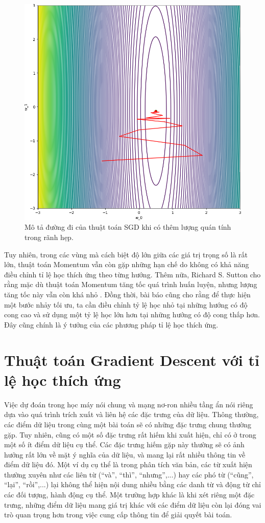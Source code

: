 \begin{figure}[htp]
	\centering
	\includegraphics[width=85 mm]{images/sgdm.png}
	\caption{Mô tả đường đi của thuật toán SGD khi có thêm lượng quán tính trong rãnh hẹp.}
	\label{fig:sgd-m}
\end{figure}

Tuy nhiên, trong các vùng mà cách biệt độ lớn giữa các giá trị trọng số là rất lớn, thuật toán Momentum vẫn còn gặp những hạn chế do không có khả năng điều chỉnh tỉ lệ học thích ứng theo từng hướng. Thêm nữa, Richard S. Sutton cho rằng mặc dù thuật toán Momentum tăng tốc quá trình huấn luyện, nhưng lượng tăng tốc này vẫn còn khá nhỏ \cite{sutton1986two}. Đồng thời, bài báo cũng cho rằng để thực hiện một bước nhảy tối ưu, ta cần điều chỉnh tỷ lệ học nhỏ tại những hướng có độ cong cao và sử dụng một tỷ lệ học lớn hơn tại những hướng có độ cong thấp hơn. Đây cũng chính là ý tưởng của các phương pháp tỉ lệ học thích ứng.

\section{Thuật toán Gradient Descent với tỉ lệ học thích ứng}

Việc dự đoán trong học máy nói chung và mạng nơ-ron nhiều tầng ẩn nói riêng dựa vào quá trình trích xuất và liên hệ các đặc trưng của dữ liệu. Thông thường, các điểm dữ liệu trong cùng một bài toán sẽ có những đặc trưng chung thường gặp. Tuy nhiên, cũng có một số đặc trưng rất hiếm khi xuất hiện, chỉ có ở trong một số ít điểm dữ liệu cụ thể. Các đặc trưng hiếm gặp này thường sẽ có ảnh hưởng rất lớn về mặt ý nghĩa của dữ liệu, và mang lại rất nhiều thông tin về điểm dữ liệu đó\cite{salton1988term}. Một ví dụ cụ thể là trong phân tích văn bản, các từ xuất hiện thường xuyên như các liên từ (``và'', ``thì'', ``nhưng'',...) hay các phó từ (``cũng'', ``lại'', ``rồi'',...) lại không thể hiện nội dung nhiều bằng các danh từ và động từ chỉ các đối tượng, hành động cụ thể. Một trường hợp khác là khi xét riêng một đặc trưng, những điểm dữ liệu mang giá trị khác với các điểm dữ liệu còn lại đóng vai trò quan trọng hơn trong việc cung cấp thông tin để giải quyết bài toán.

